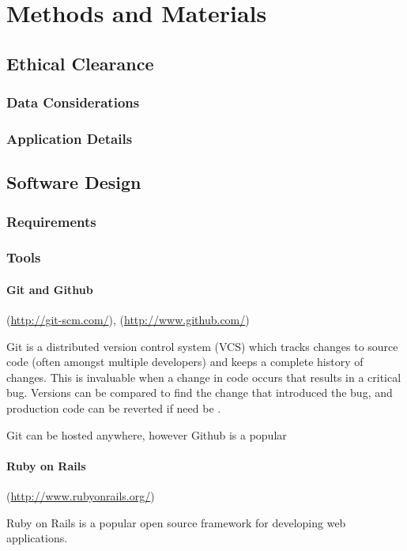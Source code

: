 \section{Methods and Materials}
\label{methods}
\subsection{Ethical Clearance}
\label{methods_ethical}
\subsubsection*{Data Considerations}
\subsubsection*{Application Details}

\subsection{Software Design}
\label{methods_softwaredesign}
\subsubsection{Requirements}
\subsubsection{Tools}
\paragraph{Git and Github}
(\url{http://git-scm.com/}),
(\url{http://www.github.com/})

Git is a distributed version control system (VCS) which tracks changes
to source code (often amongst multiple developers) and keeps a complete history
of changes. This is invaluable when a change in code occurs that results in a critical
bug. Versions can be compared to find the change that introduced the bug, and production
code can be reverted if need be \cite{scott_chacon_pro_2009}.

Git can be hosted anywhere, however Github is a popular 

\paragraph{Ruby on Rails}
(\url{http://www.rubyonrails.org/})

Ruby on Rails is a popular open source framework for developing web applications\cite{bachle_ruby_2007}.

